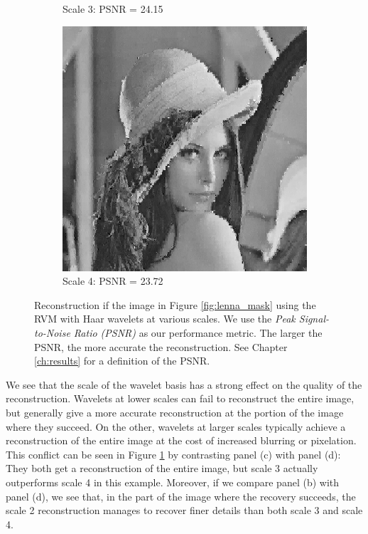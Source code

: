 \begin{figure}
\begin{subfigure}{0.4\textwidth}
    \caption{Scale 3: PSNR = 24.15}
  \end{subfigure}
  \begin{subfigure}{0.4\textwidth}
    \includegraphics[width=\textwidth]{Chapter5/Images/lenna_haar4.png}
    \caption{Scale 4: PSNR = 23.72}
  \end{subfigure}  
  \caption[Reconstruction of masked image signals using Haar wavelets at various scales]{Reconstruction if the image in Figure \ref{fig:lenna_mask} using the RVM with Haar wavelets at various scales.
    We use the \emph{Peak Signal-to-Noise Ratio (PSNR)} as our performance metric. The larger the PSNR, the more accurate the reconstruction. See Chapter \ref{ch:results} for a definition of the PSNR.}
  \label{fig:lenna_rvm}
\end{figure}

We see that the scale of the wavelet basis has a strong effect on the quality of the reconstruction.
Wavelets at lower scales can fail to reconstruct the entire image, but generally give a more accurate reconstruction at the portion of the image where they succeed.
On the other, wavelets at larger scales typically achieve a reconstruction of the entire image at the cost of increased blurring or pixelation.
This conflict can be seen in Figure \ref{fig:lenna_rvm} by contrasting panel (c) with panel (d): They both get a reconstruction of the entire image, but scale 3 actually outperforms scale 4 in this example.
Moreover, if we compare panel (b) with panel (d), we see that, in the part of the image where the recovery succeeds, the scale 2 reconstruction manages to recover finer details than both scale 3 and scale 4.

